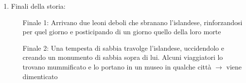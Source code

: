 \documentclass{article}
\begin{document}
\begin{enumerate}
    \item Finali della storia:
        \begin{itemize}
            \item[Finale 1:] Arrivano due leoni deboli che sbranano l'islandese, rinforzandosi
                per quel giorno e posticipando di un giorno quello della loro morte
            \item[Finale 2:] Una tempesta di sabbia travolge l'islandese, uccidendolo e creando
                un monumento di sabbia sopra di lui. Alcuni viaggiatori lo trovano mummificato
                e lo portano in un museo in qualche città $\rightarrow$ viene dimenticato
        \end{itemize}
\end{enumerate}

\newpage
\end{document}
